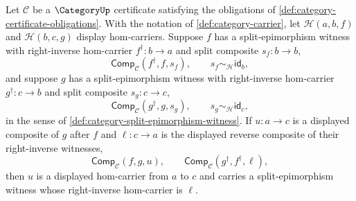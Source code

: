 \begin{theorem}
\label{thm:category-split-epimorphism-composition-closed}
Let $\mathcal C$ be a $\CategoryUp$ certificate satisfying the obligations of
\autoref{def:category-certificate-obligations}. With the notation of
\autoref{def:category-carrier}, let $\mathcal H(a,b,f)$ and
$\mathcal H(b,c,g)$ display hom-carriers. Suppose $f$ has a
split-epimorphism witness with right-inverse hom-carrier
$f^\dagger:b\to a$ and split composite $s_f:b\to b$,
$$
\mathsf{Comp}_{\mathcal C}(f^\dagger,f,s_f),
\qquad
s_f\sim_{\mathcal H}\mathsf{id}_b,
$$
and suppose $g$ has a split-epimorphism witness with right-inverse
hom-carrier $g^\dagger:c\to b$ and split composite $s_g:c\to c$,
$$
\mathsf{Comp}_{\mathcal C}(g^\dagger,g,s_g),
\qquad
s_g\sim_{\mathcal H}\mathsf{id}_c,
$$
in the sense of \autoref{def:category-split-epimorphism-witness}. If
$u:a\to c$ is a displayed composite of $g$ after $f$ and $\ell:c\to a$ is
the displayed reverse composite of their right-inverse witnesses,
$$
\mathsf{Comp}_{\mathcal C}(f,g,u),
\qquad
\mathsf{Comp}_{\mathcal C}(g^\dagger,f^\dagger,\ell),
$$
then $u$ is a displayed hom-carrier from $a$ to $c$ and carries a
split-epimorphism witness whose right-inverse hom-carrier is $\ell$.
\end{theorem}
